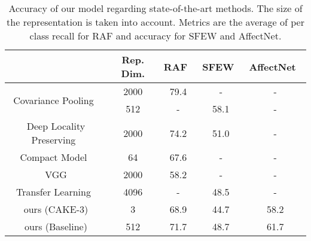\documentclass{bmvc2k}
\begin{document}
\begin{table}
\begin{tabular}{c|c|ccc|}
\cline{2-5}
    & Rep. Dim. & \multicolumn{1}{c}{RAF~\cite{li_reliable_2017}} & \multicolumn{1}{c}{SFEW~\cite{dhall_static_2011}} & AffectNet~\cite{mollahosseini_affectnet:_2017}    \\ \hline
\multicolumn{1}{|c|}{\multirow{2}{*}{Covariance Pooling~\cite{acharya_covariance_2018}}}    & 2000                & 79.4                     & -                         & -              \\ \cline{2-5} 
\multicolumn{1}{|c|}{}                                                                      & 512                 & -                        & 58.1                     & -              \\ \hline
\multicolumn{1}{|c|}{Deep Locality Preserving~\cite{li_reliable_2017}}                      & 2000                & 74.2                    & 51.0                     & -              \\ \hline
\multicolumn{1}{|c|}{Compact Model~\cite{kuo2018compact}}                                   & 64                  & 67.6                    & -                         & -              \\ \hline
\multicolumn{1}{|c|}{VGG\cite{li_reliable_2017}}                                            & 2000                & 58.2                    & -                         & -              \\ \hline
\multicolumn{1}{|c|}{Transfer Learning~\cite{ng_deep_2015}}                                 & 4096                & -                        & 48.5                      & -              \\ \hline\hline
\multicolumn{1}{|c|}{{ours (CAKE-3)}}                                                      & {3}          & {68.9}           & {44.7}            & {58.2} \\ \hline
\multicolumn{1}{|c|}{{ours (Baseline)}}                                                & {512}        & {71.7}           & {48.7}            & {61.7} \\ \hline
\end{tabular}
\caption{Accuracy of our model regarding state-of-the-art methods. The size of the representation is taken into account. Metrics are the average of per class recall for RAF and accuracy for SFEW and AffectNet.}
\label{table:comparison}
\end{table}
\end{document}
